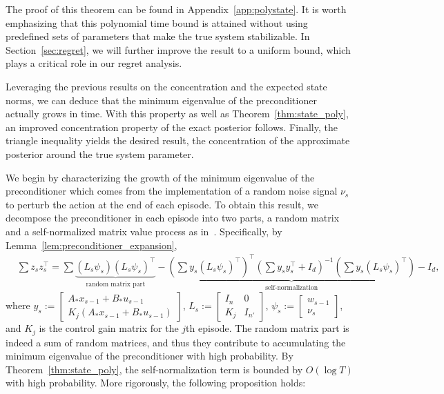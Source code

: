 \documentclass[11pt]{article}
\theoremstyle{plain}
\theoremstyle{definition}
\theoremstyle{remark}
\begin{document}
The proof of this theorem can be found in Appendix~\ref{app:polystate}.
It is worth emphasizing that this polynomial time bound is attained without using predefined sets of parameters that make the true system stabilizable. 
In Section~\ref{sec:regret}, we will further improve the result to a uniform bound, which plays a critical role in our regret analysis. 



Leveraging the previous results on the concentration and the expected state norms, we can deduce that the minimum eigenvalue of the preconditioner actually grows in time. 
With this property as well as Theorem~\ref{thm:state_poly}, an improved concentration property of the exact posterior follows. Finally, the triangle inequality yields the desired result, the concentration of the approximate posterior around the true system parameter.

We begin by characterizing the growth of the minimum eigenvalue of the preconditioner which comes from the implementation of a random noise signal $\nu_s$ to perturb the action at the end of each episode.
To obtain this result, we decompose the preconditioner in each episode into two parts, a random matrix and a self-normalized matrix value process as in~\cite{jedra2022minimal}. 
Specifically, by Lemma~\ref{lem:preconditioner_expansion}, 
\begin{equation}\nonumber
\begin{split}
&\sum z_s z_s^\top=\sum  \underbrace{(L_s\psi_s)(L_s\psi_s)^{\top}}_{\text{random matrix part}} - \underbrace{(\sum  y_s (L_s \psi_s)^{\top})^{\top}(\sum y_sy_s^{\top}+  I_d)^{-1}(\sum   y_s (L_s \psi_s)^{\top})}_{\text{self-normalization}} -  I_d,
\end{split}
\end{equation}
where $y_s := 
\begin{bmatrix}
    A_*x_{s-1} + B_*u_{s-1}          \\
    K_j(A_*x_{s-1} + B_*u_{s-1})
\end{bmatrix}$, 
$L_s := 
\begin{bmatrix}
    I_n & 0\\
    K_j & I_{n'}
\end{bmatrix}$,
 $\psi_s :=
\begin{bmatrix}
    w_{s-1}\\
    \nu_{s}
\end{bmatrix}$, and $K_j$ is  the control gain matrix for the $j$th episode.
The random matrix part is indeed a sum of random matrices, and thus they contribute to accumulating the minimum eigenvalue of the preconditioner with high probability.
By Theorem~\ref{thm:state_poly}, the self-normalization term is bounded by $O(\log T)$ with high probability.
More rigorously, the following proposition holds:
\end{document}
